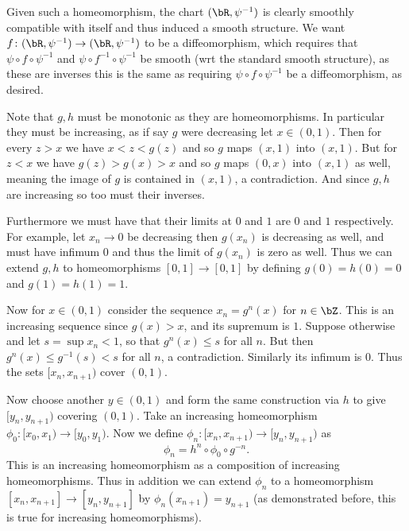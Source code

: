 \eprob

\benum
    \item Given such a homeomorphism, the chart $(\bR,\psi^{-1})$ is clearly smoothly compatible with itself
    and thus induced a smooth structure.
    We want $f\colon(\bR,\psi^{-1})\to(\bR,\psi^{-1})$ to be a diffeomorphism, which requires that
    $\psi\circ f\circ\psi^{-1}$ and $\psi\circ f^{-1}\circ\psi^{-1}$ be smooth (wrt the standard smooth
    structure), as these are inverses this is the same as requiring $\psi\circ f\circ\psi^{-1}$ be a
    diffeomorphism, as desired.

    \item Note that $g,h$ must be monotonic as they are homeomorphisms.
    In particular they must be increasing, as if say $g$ were decreasing let $x\in(0,1)$.
    Then for every $z>x$ we have $x<z<g(z)$ and so $g$ maps $(x,1)$ into $(x,1)$.
    But for $z<x$ we have $g(z)>g(x)>x$ and so $g$ maps $(0,x)$ into $(x,1)$ as well, meaning the image of
    $g$ is contained in $(x,1)$, a contradiction.
    And since $g,h$ are increasing so too must their inverses.

    Furthermore we must have that their limits at $0$ and $1$ are $0$ and $1$ respectively.
    For example, let $x_n\to0$ be decreasing then $g(x_n)$ is decreasing as well, and must have infimum
    $0$ and thus the limit of $g(x_n)$ is zero as well.
    Thus we can extend $g,h$ to homeomorphisms $[0,1]\to[0,1]$ by defining $g(0)=h(0)=0$ and $g(1)=h(1)=1$.

    Now for $x\in(0,1)$ consider the sequence $x_n=g^n(x)$ for $n\in\bZ$.
    This is an increasing sequence since $g(x)>x$, and its supremum is $1$.
    Suppose otherwise and let $s=\sup x_n<1$, so that $g^n(x)\leq s$ for all $n$.
    But then $g^n(x)\leq g^{-1}(s)<s$ for all $n$, a contradiction.
    Similarly its infimum is $0$.
    Thus the sets $[x_n,x_{n+1})$ cover $(0,1)$.

    Now choose another $y\in(0,1)$ and form the same construction via $h$ to give $[y_n,y_{n+1})$ covering
    $(0,1)$.
    Take an increasing homeomorphism $\phi_0\colon[x_0,x_1)\to[y_0,y_1)$.
    Now we define $\phi_n\colon[x_n,x_{n+1})\to[y_n,y_{n+1})$ as
    $$ \phi_n = h^n\circ\phi_0\circ g^{-n} . $$
    This is an increasing homeomorphism as a composition of increasing homeomorphisms.
    Thus in addition we can extend $\phi_n$ to a homeomorphism $[x_n,x_{n+1}]\to[y_n,y_{n+1}]$ by
    $\phi_n(x_{n+1})=y_{n+1}$ (as demonstrated before, this is true for increasing homeomorphisms).

